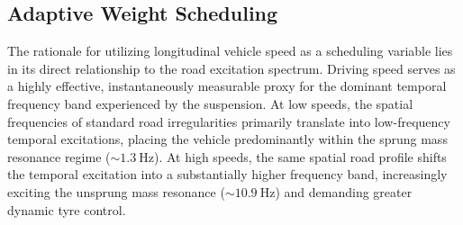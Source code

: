 \subsection{Adaptive Weight Scheduling}\label{subsec:mpc_scheduling}The rationale for utilizing longitudinal vehicle speed as a scheduling variable lies in its direct relationship to the road excitation spectrum. Driving speed serves as a highly effective, instantaneously measurable proxy for the dominant temporal frequency band experienced by the suspension. At low speeds, the spatial frequencies of standard road irregularities primarily translate into low-frequency temporal excitations, placing the vehicle predominantly within the sprung mass resonance regime ($\sim\SI{1.3}{\hertz}$). At high speeds, the same spatial road profile shifts the temporal excitation into a substantially higher frequency band, increasingly exciting the unsprung mass resonance ($\sim\SI{10.9}{\hertz}$) and demanding greater dynamic tyre control.
